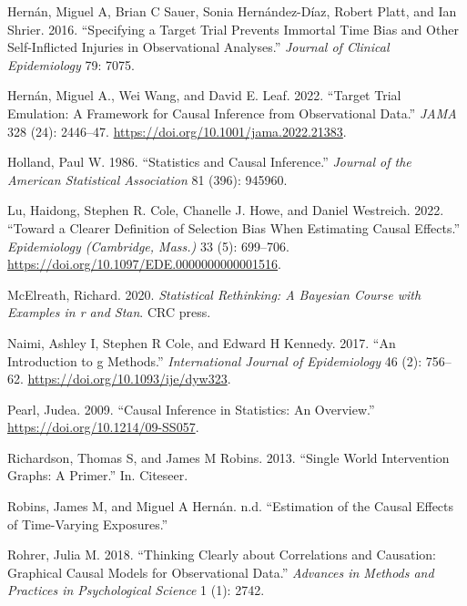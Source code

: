 \documentclass[
  singlecolumn]{report}
\newlength{\cslhangindent}
\newlength{\cslentryspacingunit} %
\newenvironment{CSLReferences}[2] %
 {%
  \setlength{\parindent}{0pt}
  \ifodd #1
  \let\oldpar\par
  \def\par{\hangindent=\cslhangindent\oldpar}
  \fi
  \setlength{\parskip}{#2\cslentryspacingunit}
 }%
 {}
\begin{document}
\begin{CSLReferences}{1}{0}
\leavevmode{}%
Hernán, Miguel A, Brian C Sauer, Sonia Hernández-Díaz, Robert Platt, and
Ian Shrier. 2016. {``Specifying a Target Trial Prevents Immortal Time
Bias and Other Self-Inflicted Injuries in Observational Analyses.''}
\emph{Journal of Clinical Epidemiology} 79: 7075.

\leavevmode{}%
Hernán, Miguel A., Wei Wang, and David E. Leaf. 2022. {``Target Trial
Emulation: A Framework for Causal Inference from Observational Data.''}
\emph{JAMA} 328 (24): 2446--47.
\url{https://doi.org/10.1001/jama.2022.21383}.

\leavevmode{}%
Holland, Paul W. 1986. {``Statistics and Causal Inference.''}
\emph{Journal of the American Statistical Association} 81 (396): 945960.

\leavevmode{}%
Lu, Haidong, Stephen R. Cole, Chanelle J. Howe, and Daniel Westreich.
2022. {``Toward a Clearer Definition of Selection Bias When Estimating
Causal Effects.''} \emph{Epidemiology (Cambridge, Mass.)} 33 (5):
699--706. \url{https://doi.org/10.1097/EDE.0000000000001516}.

\leavevmode{}%
McElreath, Richard. 2020. \emph{Statistical Rethinking: A Bayesian
Course with Examples in r and Stan}. CRC press.

\leavevmode{}%
Naimi, Ashley I, Stephen R Cole, and Edward H Kennedy. 2017. {``An
Introduction to g Methods.''} \emph{International Journal of
Epidemiology} 46 (2): 756--62. \url{https://doi.org/10.1093/ije/dyw323}.

\leavevmode{}%
Pearl, Judea. 2009. {``Causal Inference in Statistics: An Overview.''}
\url{https://doi.org/10.1214/09-SS057}.

\leavevmode{}%
Richardson, Thomas S, and James M Robins. 2013. {``Single World
Intervention Graphs: A Primer.''} In. Citeseer.

\leavevmode{}%
Robins, James M, and Miguel A Hernán. n.d. {``Estimation of the Causal
Effects of Time-Varying Exposures.''}

\leavevmode{}%
Rohrer, Julia M. 2018. {``Thinking Clearly about Correlations and
Causation: Graphical Causal Models for Observational Data.''}
\emph{Advances in Methods and Practices in Psychological Science} 1 (1):
2742.


\end{CSLReferences}
\end{document}
